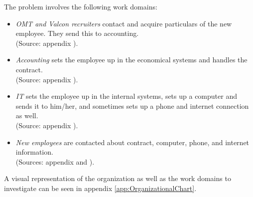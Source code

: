 The problem involves the following work domains:

\begin{itemize}
\item \emph{OMT and Valcon recruiters} contact and acquire particulars of the new employee. They send this to accounting. \\
(Source: appendix ).

\item \emph{Accounting} sets the employee up in the economical systems and handles the contract. \\
(Source: appendix ).

\item \emph{IT} sets the employee up in the internal systems, sets up a computer and sends it to him/her, and sometimes sets up a phone and internet connection as well. \\
(Source: appendix ).

\item \emph{New employees} are contacted about contract, computer, phone, and internet information. \\
(Sources: appendix  and ).
\end{itemize}

A visual representation of the organization as well as the work domains to investigate can be seen in appendix \ref{app:OrganizationalChart}.